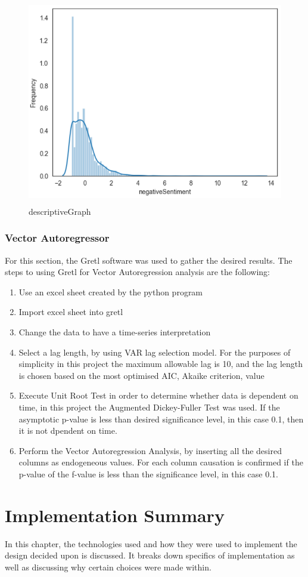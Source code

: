 \begin{figure}[h!]
    \centering
    \includegraphics[width=15cm,height=9cm,keepaspectratio]{implementation/descriptiveGraph.png}
    \caption{descriptiveGraph}
    \label{fig:descriptiveGraph}
\end{figure}

\subsubsection{Vector Autoregressor}

For this section, the Gretl software was used to gather the desired results. The steps to using Gretl for Vector Autoregression analysis are the following:
\begin{enumerate}
    \item Use an excel sheet created by the python program
    \item Import excel sheet into gretl
    \item Change the data to have a time-series interpretation
    \item Select a lag length, by using VAR lag selection model. For the purposes of simplicity in this project the maximum allowable lag is 10, and the lag length is chosen based on the most optimised AIC, Akaike criterion, value
    \item Execute Unit Root Test in order to determine whether data is dependent on time, in this project the Augmented Dickey-Fuller Test was used. If the asymptotic p-value is less than desired significance level, in this case 0.1, then it is not dpendent on time.
    \item Perform the Vector Autoregression Analysis, by inserting all the desired columns as endogeneous values. For each column causation is confirmed if the p-value of the f-value is less than the significance level, in this case 0.1.
\end{enumerate}

\section{Implementation Summary}

In this chapter, the technologies used and how they were used to implement the design decided upon is discussed. It breaks down specifics of implementation as well as discussing why certain choices were made within.